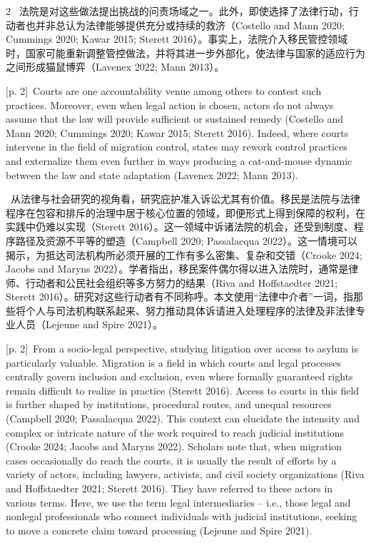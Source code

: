 \documentclass[10pt,a4paper]{article}
\begin{document}
\begin{paracol}{2}
\switchcolumn*
{\scriptsize\color{gray} [p. 2]}\ 法院是对这些做法提出挑战的问责场域之一。此外，即使选择了法律行动，行动者也并非总认为法律能够提供充分或持续的救济（Costello and Mann 2020; Cummings 2020; Kawar 2015; Sterett 2016）。事实上，法院介入移民管控领域时，国家可能重新调整管控做法，并将其进一步外部化，使法律与国家的适应行为之间形成猫鼠博弈（Lavenex 2022; Mann 2013）。\par
\switchcolumn
{\scriptsize\color{gray} [p. 2]}\ Courts are one accountability venue among others to contest such practices. Moreover, even when legal action is chosen, actors do not always assume that the law will provide sufficient or sustained remedy (Costello and Mann 2020; Cummings 2020; Kawar 2015; Sterett 2016). Indeed, where courts intervene in the field of migration control, states may rework control practices and externalize them even further in ways producing a cat-and-mouse dynamic between the law and state adaptation (Lavenex 2022; Mann 2013).\par
\switchcolumn*
{\scriptsize\color{gray} [p. 2]}\ 从法律与社会研究的视角看，研究庇护准入诉讼尤其有价值。移民是法院与法律程序在包容和排斥的治理中居于核心位置的领域，即便形式上得到保障的权利，在实践中仍难以实现（Sterett 2016）。这一领域中诉诸法院的机会，还受到制度、程序路径及资源不平等的塑造（Campbell 2020; Passalacqua 2022）。这一情境可以揭示，为抵达司法机构所必须开展的工作有多么密集、复杂和交错（Crooke 2024; Jacobs and Maryns 2022）。学者指出，移民案件偶尔得以进入法院时，通常是律师、行动者和公民社会组织等多方努力的结果（Riva and Hoffstaedter 2021; Sterett 2016）。研究对这些行动者有不同称呼。本文使用“法律中介者”一词，指那些将个人与司法机构联系起来、努力推动具体诉请进入处理程序的法律及非法律专业人员（Lejeune and Spire 2021）。\par
\switchcolumn
{\scriptsize\color{gray} [p. 2]}\ From a socio-legal perspective, studying litigation over access to asylum is particularly valuable. Migration is a field in which courts and legal processes centrally govern inclusion and exclusion, even where formally guaranteed rights remain difficult to realize in practice (Sterett 2016). Access to courts in this field is further shaped by institutions, procedural routes, and unequal resources (Campbell 2020; Passalacqua 2022). This context can elucidate the intensity and complex or intricate nature of the work required to reach judicial institutions (Crooke 2024; Jacobs and Maryns 2022). Scholars note that, when migration cases occasionally do reach the courts, it is usually the result of efforts by a variety of actors, including lawyers, activists, and civil society organizations (Riva and Hoffstaedter 2021; Sterett 2016). They have referred to these actors in various terms. Here, we use the term legal intermediaries – i.e., those legal and nonlegal professionals who connect individuals with judicial institutions, seeking to move a concrete claim toward processing (Lejeune and Spire 2021).\par

\end{paracol}
\end{document}
